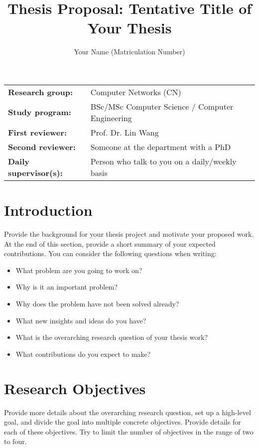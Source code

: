 \documentclass[report]{../upb-cn}
\title{Thesis Proposal: Tentative Title of Your Thesis}
\author{Your Name (Matriculation Number)}
\begin{document}
\maketitle

\begin{notebox}
    \begin{tabular}{@{}ll}
        \textbf{Research group:} & Computer Networks (CN) \\
        \textbf{Study program:} & BSc/MSc Computer Science / Computer Engineering \\
        \textbf{First reviewer:} & Prof. Dr. Lin Wang \\
        \textbf{Second reviewer:} & Someone at the department with a PhD \\
        \textbf{Daily supervisor(s):} & Person who talk to you on a daily/weekly basis
    \end{tabular}
\end{notebox}

\section{Introduction}
\label{sec:introduction}

Provide the background for your thesis project and motivate your proposed work. At the end of this section, provide a short summary of your expected contributions. You can consider the following questions when writing:

\begin{itemize}
    \item What problem are you going to work on?
    \item Why is it an important problem?
    \item Why does the problem have not been solved already?
    \item What new insights and ideas do you have?
    \item What is the overarching research question of your thesis work?
    \item What contributions do you expect to make? 
\end{itemize}

\section{Research Objectives}
\label{sec:objectives}

Provide more details about the overarching research question, set up a high-level goal, and divide the goal into multiple concrete objectives. Provide details for each of these objectives. Try to limit the number of objectives in the range of two to four. 
\end{document}
